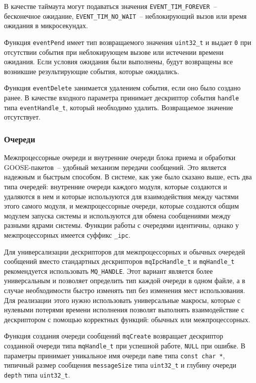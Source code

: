 В качестве таймаута могут подаваться значения \lstinline{EVENT_TIM_FOREVER}~-- бесконечное ожидание, \lstinline{EVENT_TIM_NO_WAIT}~-- неблокирующий вызов или
время ожидания в микросекундах.

Функция \lstinline{eventPend} имеет тип возвращаемого значения \lstinline{uint32_t} и выдает \lstinline{0} при отсутствии события при неблокирующем вызове или истечении времени ожидания. Если условия ожидания были выполнены, будут
возвращены все возникшие результирующие события, которые ожидались.

Функция \lstinline{eventDelete} занимается удалением события, если оно было создано ранее.
В качестве входного параметра
принимает дескриптор события \lstinline{handle} типа \lstinline{eventHandle_t}, который необходимо удалить. Возвращаемое значение отсутствует.

\subsubsection{Очереди}

Межпроцессорные очереди и внутренние очереди блока приема и обработки GOOSE-пакетов~-- удобный механизм передачи сообщений. Это является надежным и быстрым способом. В системе,
как уже было сказано выше, есть два типа очередей: внутренние очереди каждого модуля, которые создаются и удаляются в нем и которые используются для взаимодействия между частями этого самого модуля, и межпроцессорные очереди, которые создаются общим модулем запуска системы и используются для обмена сообщениями между разными ядрами системы. Функции работы с
очередями идентичны, однако у межпроцессорных имеется суффикс \lstinline{_ipc}.

Для универсализации дескрипторов для межпроцессорных и обычных очередей сообщений
вместо стандартных дескрипторов
\lstinline{mqIpcHandle_t} и \lstinline{mqHandle_t}
рекомендуется использовать \lstinline{MQ_HANDLE}. Этот вариант является более
универсальным и позволяет определить тип каждой очереди в одном файле,
а в случае необходимости быстро изменять тип без изменения мест использования.
Для реализации этого нужно
использовать универсальные макросы, которые с нулевыми потерями времени исполнения
позволят выполнять взаимодействие с дескриптором с помощью корректных функций:
обычных или межпроцессорных.

Функция создания очереди сообщений \lstinline{mqCreate} возвращает дескриптор созданной очереди типа \lstinline{mqHandle_t} при успешной работе, \lstinline{NULL} при ошибке.
В параметры принимает уникальное имя очереди \lstinline{name} типа \lstinline{const char *}, типичный размер сообщения \lstinline{messageSize} типа \lstinline{uint32_t} и глубину очереди
\lstinline{depth} типа \lstinline{uint32_t}.

